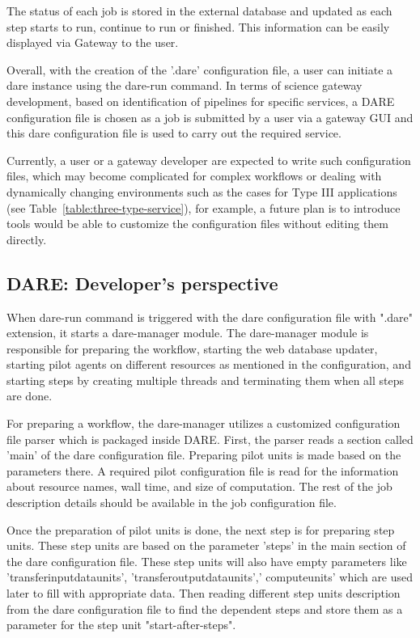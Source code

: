 \documentclass[]{svjour3}
\begin{document}
The status of each job is stored in the external database and updated as each step starts to run, continue to run or finished.  This information can be easily displayed via Gateway to the user.  

Overall, with the creation of the '.dare' configuration file, a user can initiate a dare instance using the dare-run command.  In terms of science gateway development, based on identification of pipelines for specific services, a DARE configuration file is chosen as a job is submitted by a user via a gateway GUI and this dare configuration file is used to carry out the required service.

Currently, a user or a gateway developer are expected to write such configuration files, which may become complicated for complex workflows or dealing with dynamically changing environments such as the cases for Type III applications (see Table~\ref{table:three-type-service}), for example, a future plan is to introduce tools would be able to customize the configuration files without editing them directly.   

\subsection{DARE: Developer's perspective}

When dare-run command is triggered with the dare configuration file with ".dare" extension, it starts a dare-manager module.  The dare-manager module is responsible for preparing the workflow, starting the web database updater, starting pilot agents on different resources as mentioned in the configuration, and starting steps by creating multiple threads and terminating them when all steps are done.

For preparing a workflow, the dare-manager utilizes a customized configuration file parser which is packaged inside DARE.  First, the parser reads a section called 'main' of the dare configuration file.   Preparing pilot units is made based on the parameters there.   A required pilot configuration file is read for the information about resource names, wall time, and size of computation.  The rest of the job description details should be available in the job configuration file.

Once the preparation of pilot units is done, the next step is for preparing step units.  These step units are based on the parameter 'steps' in the main section of the dare configuration file.  These step units will also have empty parameters like 'transfer\textunderscore input\textunderscore data\textunderscore units', 'transfer\textunderscore output\textunderscore data\textunderscore units',' compute\textunderscore units' which are used later to fill with appropriate data.  Then reading different step units description from the dare configuration file to find the dependent steps and store them as a parameter for the step unit "start-after-steps". 
\end{document}
